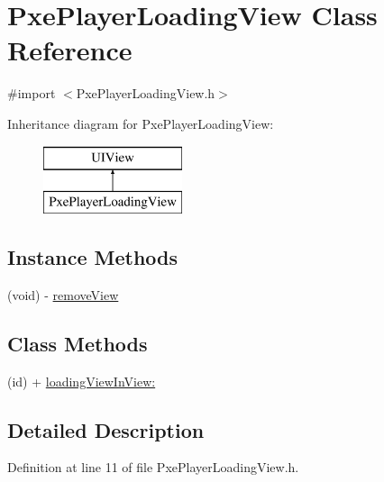 \hypertarget{interface_pxe_player_loading_view}{\section{Pxe\-Player\-Loading\-View Class Reference}
\label{interface_pxe_player_loading_view}
}


{\ttfamily \#import $<$Pxe\-Player\-Loading\-View.\-h$>$}

Inheritance diagram for Pxe\-Player\-Loading\-View\-:\begin{figure}[H]
\begin{center}
\leavevmode
\includegraphics[height=2.000000cm]{interface_pxe_player_loading_view}
\end{center}
\end{figure}
\subsection*{Instance Methods}
\begin{DoxyCompactItemize}
\item 
(void) -\/ \hyperlink{interface_pxe_player_loading_view_a6b4358f253d0ceec53276830a2c064ba}{remove\-View}
\end{DoxyCompactItemize}
\subsection*{Class Methods}
\begin{DoxyCompactItemize}
\item 
(id) + \hyperlink{interface_pxe_player_loading_view_af369e5258443bcf7c4420fab7012e2bc}{loading\-View\-In\-View\-:}
\end{DoxyCompactItemize}


\subsection{Detailed Description}


Definition at line 11 of file Pxe\-Player\-Loading\-View.\-h.



